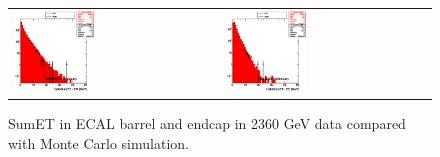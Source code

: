 \begin{figure}[h!]
 \centering
 \begin{tabular}{ll}
  \includegraphics[width=0.40\textwidth]{plots_DataVsMC_MB_2360GeV/h_caloSumetEB.eps} &
  \includegraphics[width=0.40\textwidth]{plots_DataVsMC_MB_2360GeV/h_caloSumetEE.eps} \\
 \end{tabular}
 \caption{SumET in ECAL barrel and endcap in 2360 GeV data compared
   with Monte Carlo simulation.
          \label{fig:DataVsMC_MB_2360_4}}
\end{figure}

